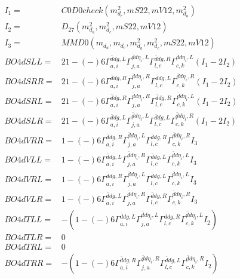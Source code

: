 \documentclass[A4,landscape]{article}
\begin{document}
\begin{align} 
I_1 = & C0D0check(m^2_{d_{{c}}}, mS22, mV12, m^2_{d_{{a}}}) \\ 
I_2 = & D_{27}(m^2_{d_{{a}}}, m^2_{d_{{c}}}, mS22, mV12) \\ 
I_3 = & MMD0(m_{d_{{a}}}, m_{d_{{c}}}, m^2_{d_{{a}}}, m^2_{d_{{c}}}, mS22, mV12) \\ 
  BO4dSLL= & 2   1
-(-)
  6 \Gamma^{\bar{d}d g ,L}_{a, i} \Gamma^{\bar{d}d \eta_i ,L}_{j, a} \Gamma^{\bar{d}d g ,R}_{l, c} \Gamma^{\bar{d}d \eta_i ,L}_{c, k} (I_1 - 2 I_2) \\ 
  BO4dSRR= & 2   1
-(-)
  6 \Gamma^{\bar{d}d g ,R}_{a, i} \Gamma^{\bar{d}d \eta_i ,R}_{j, a} \Gamma^{\bar{d}d g ,L}_{l, c} \Gamma^{\bar{d}d \eta_i ,R}_{c, k} (I_1 - 2 I_2) \\ 
  BO4dSRL= & 2   1
-(-)
  6 \Gamma^{\bar{d}d g ,R}_{a, i} \Gamma^{\bar{d}d \eta_i ,R}_{j, a} \Gamma^{\bar{d}d g ,R}_{l, c} \Gamma^{\bar{d}d \eta_i ,L}_{c, k} (I_1 - 2 I_2) \\ 
  BO4dSLR= & 2   1
-(-)
  6 \Gamma^{\bar{d}d g ,L}_{a, i} \Gamma^{\bar{d}d \eta_i ,L}_{j, a} \Gamma^{\bar{d}d g ,L}_{l, c} \Gamma^{\bar{d}d \eta_i ,R}_{c, k} (I_1 - 2 I_2) \\ 
  BO4dVRR= &   1
-(-)
  6 \Gamma^{\bar{d}d g ,R}_{a, i} \Gamma^{\bar{d}d \eta_i ,L}_{j, a} \Gamma^{\bar{d}d g ,R}_{l, c} \Gamma^{\bar{d}d \eta_i ,R}_{c, k} I_3 \\ 
  BO4dVLL= &   1
-(-)
  6 \Gamma^{\bar{d}d g ,L}_{a, i} \Gamma^{\bar{d}d \eta_i ,R}_{j, a} \Gamma^{\bar{d}d g ,L}_{l, c} \Gamma^{\bar{d}d \eta_i ,L}_{c, k} I_3 \\ 
  BO4dVRL= &   1
-(-)
  6 \Gamma^{\bar{d}d g ,R}_{a, i} \Gamma^{\bar{d}d \eta_i ,L}_{j, a} \Gamma^{\bar{d}d g ,L}_{l, c} \Gamma^{\bar{d}d \eta_i ,L}_{c, k} I_3 \\ 
  BO4dVLR= &   1
-(-)
  6 \Gamma^{\bar{d}d g ,L}_{a, i} \Gamma^{\bar{d}d \eta_i ,R}_{j, a} \Gamma^{\bar{d}d g ,R}_{l, c} \Gamma^{\bar{d}d \eta_i ,R}_{c, k} I_3 \\ 
  BO4dTLL= & -(  1
-(-)
  6 \Gamma^{\bar{d}d g ,L}_{a, i} \Gamma^{\bar{d}d \eta_i ,L}_{j, a} \Gamma^{\bar{d}d g ,R}_{l, c} \Gamma^{\bar{d}d \eta_i ,L}_{c, k} I_2) \\ 
  BO4dTLR= & 0 \\ 
  BO4dTRL= & 0 \\ 
  BO4dTRR= & -(  1
-(-)
  6 \Gamma^{\bar{d}d g ,R}_{a, i} \Gamma^{\bar{d}d \eta_i ,R}_{j, a} \Gamma^{\bar{d}d g ,L}_{l, c} \Gamma^{\bar{d}d \eta_i ,R}_{c, k} I_2) \\ 
\end{align} 
\end{document}

